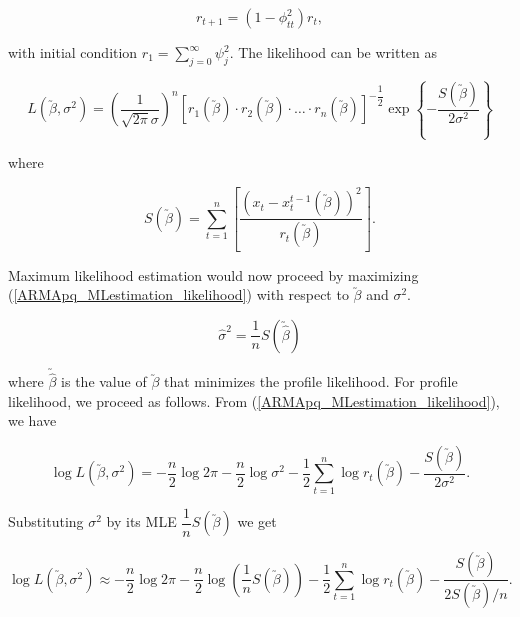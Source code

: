 \documentclass[11pt, a4paper]{article}
\numberwithin{equation}{section}
\theoremstyle{definition}
\begin{document}
\begin{equation} \label{r_t_recursive_relation}
r_{t+1} = (1 - \phi_{tt}^2) r_t,
\end{equation}

with initial condition $r_1 = \sum \limits_{j = 0}^{\infty} \psi_j^2$. The likelihood can be written as

\begin{equation}\label{ARMApq_MLestimation_likelihood}
L(\utilde{\beta}, \sigma^2) = \left( \dfrac{1}{\sqrt{2\pi} \sigma}\right)^{n} \left[ r_1(\utilde{\beta}) \cdot r_2(\utilde{\beta}) \cdot \ldots \cdot r_n(\utilde{\beta}) \right]^{-\dfrac{1}{2}} \exp \left\{- \dfrac{S(\utilde{\beta})}{2\sigma^2} \right\}
\end{equation}

where

\begin{equation} \label{ARMA_MLE_unconditional_sum_of_squares}
S(\utilde{\beta}) = \sum \limits_{t = 1}^{n} \left[ \dfrac{(x_t - x_t^{t-1}(\utilde{\beta}))^2}{r_t(\utilde{\beta})} \right].
\end{equation}

Maximum likelihood estimation would now proceed by maximizing (\ref{ARMApq_MLestimation_likelihood}) with respect to $\utilde{\beta}$ and $\sigma^2$.

\begin{equation}
\hat{\sigma}^2 = \dfrac{1}{n} S(\utilde{\hat{\beta}})
\end{equation}
 
where $\utilde{\hat{\beta}}$ is the value of $\utilde{\beta}$ that minimizes the profile likelihood. For profile likelihood, we proceed as follows. From (\ref{ARMApq_MLestimation_likelihood}), we have

\begin{equation}
\log L(\utilde{\beta}, \sigma^2) = - \dfrac{n}{2} \log 2 \pi - \dfrac{n}{2} \log \sigma^2 - \dfrac{1}{2} \sum \limits_{t = 1}^{n} \log r_t(\utilde{\beta}) - \dfrac{S(\utilde{\beta})}{2\sigma^2}.
\end{equation}

Substituting $\sigma^2$ by its MLE $\dfrac{1}{n} S(\utilde{\beta})$ we get

\begin{equation}
\log L(\utilde{\beta}, \sigma^2) \approx - \dfrac{n}{2} \log 2 \pi - \dfrac{n}{2} \log \left( \dfrac{1}{n} S(\utilde{\beta}) \right) - \dfrac{1}{2} \sum \limits_{t = 1}^{n} \log r_t(\utilde{\beta}) - \dfrac{S(\utilde{\beta})}{2 S(\utilde{\beta}) / n}.
\end{equation}
\end{document}
